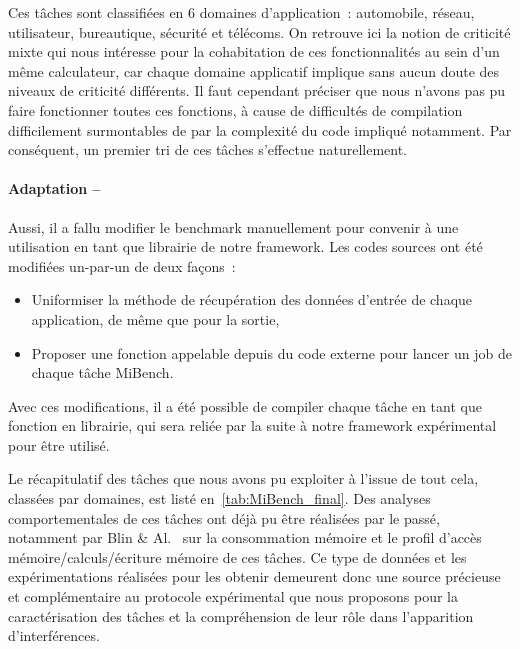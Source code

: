 \documentclass[french, a4paper, 11pt, twoside, pdftex]{StyleThese}
\begin{document}
    
    Ces tâches sont classifiées en 6 domaines d'application~: automobile, réseau, utilisateur, bureautique, sécurité et télécoms. On retrouve ici la notion de criticité mixte qui nous intéresse pour la cohabitation de ces fonctionnalités au sein d'un même calculateur, car chaque domaine applicatif implique sans aucun doute des niveaux de criticité différents.
    Il faut cependant préciser que nous n'avons pas pu faire fonctionner toutes ces fonctions, à cause de difficultés de compilation difficilement surmontables de par la complexité du code impliqué notamment. Par conséquent, un premier tri de ces tâches s'effectue naturellement. 
    
 	\paragraph{Adaptation --} Aussi, il a fallu modifier le benchmark manuellement pour convenir à une utilisation en tant que librairie de notre framework. Les codes sources ont été modifiées un-par-un de deux façons~: 
	\begin{itemize}
		\item  	Uniformiser la méthode de récupération des données d'entrée de chaque application, de même que pour la sortie,
		\item  	Proposer une fonction appelable depuis du code externe pour lancer un job de chaque tâche MiBench.
	\end{itemize} Avec ces modifications, il a été possible de compiler chaque tâche en tant que fonction en librairie, qui sera reliée par la suite à notre framework expérimental pour être utilisé.

 	Le récapitulatif des tâches que nous avons pu exploiter à l'issue de tout cela, classées par domaines, est listé en~\autoref{tab:MiBench_final}. Des analyses comportementales de ces tâches ont déjà pu être réalisées par le passé, notamment par Blin \& Al.~\cite{blin_understanding_2016} sur la consommation mémoire et le profil d'accès mémoire/calculs/écriture mémoire de ces tâches. Ce type de données et les expérimentations réalisées pour les obtenir demeurent donc une source précieuse et complémentaire au protocole expérimental que nous proposons pour la caractérisation des tâches et la compréhension de leur rôle dans l'apparition d'interférences.
    
\end{document}
